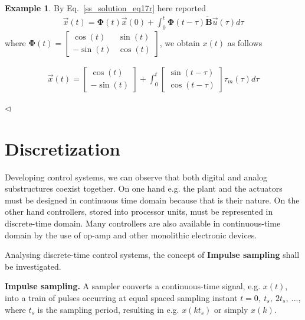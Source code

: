 \documentclass[11pt,a4paper,oneside]{book}
\numberwithin{equation}{section}
\theoremstyle{it}
\theoremstyle{definition}
\newtheorem{example}{Example}[chapter]
\begin{document}
\begin{example}
By Eq.~\eqref{ss_solution_eq17r} here reported
\begin{equation}\label{ss_solution_eq17r}
	\begin{aligned}
		\vec{x}(t) = \mathbf{\Phi}(t) \vec{x}(0) + 
		\int_{0}^{t}\mathbf{\Phi}(t-\tau)\tilde{\mathbf{B}}\vec{u}(\tau)d\tau
	\end{aligned}
\end{equation}
where $\mathbf{\Phi}(t) = \begin{bmatrix} \cos(t) & \sin(t) \\ -\sin(t) & 
\cos(t) \end{bmatrix}$, we obtain $x(t)$ as follows
\begin{mybox}
\begin{equation}
	\begin{aligned}
		\vec{x}(t) = \begin{bmatrix} \cos(t) \\[6pt] -\sin(t) \end{bmatrix} + 
		\int_{0}^{t}\begin{bmatrix} \sin(t-\tau) \\[6pt] \cos(t-\tau) 
		\end{bmatrix}\tau_m(\tau)d\tau
	\end{aligned}
\end{equation}
\end{mybox}
$\triangleleft$
\end{example}


\section{Discretization}
Developing control systems, we can observe that both digital and analog 
substructures coexist together. On one hand e.g. the plant and the actuators 
must be designed in continuous time domain because that is their nature. On the 
other hand controllers, stored into processor units,  must be represented in 
discrete-time domain. Many controllers are also available in continuous-time 
domain by the use of op-amp and other monolithic electronic devices.

Analysing discrete-time control systems, the concept of \textbf{Impulse 
	sampling} shall be investigated.

\textbf{Impulse sampling.} A sampler converts a continuous-time signal, e.g. 
$x(t)$, into a train of pulses occurring at equal spaced sampling instant $t = 
0,\ t_s,\ 2t_s,\ ...$, where $t_s$ is the sampling period, resulting in e.g. 
$x(kt_s)$ or simply $x(k)$.
\end{document}
